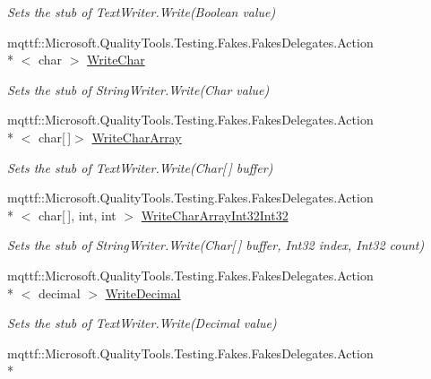 \begin{DoxyCompactItemize}
\begin{DoxyCompactList}\small\item\em Sets the stub of Text\-Writer.\-Write(\-Boolean value)\end{DoxyCompactList}\item 
mqttf\-::\-Microsoft.\-Quality\-Tools.\-Testing.\-Fakes.\-Fakes\-Delegates.\-Action\\*
$<$ char $>$ \hyperlink{class_system_1_1_i_o_1_1_fakes_1_1_stub_string_writer_a9c82eb35f37789f914836de0ba08ab08}{Write\-Char}
\begin{DoxyCompactList}\small\item\em Sets the stub of String\-Writer.\-Write(\-Char value)\end{DoxyCompactList}\item 
mqttf\-::\-Microsoft.\-Quality\-Tools.\-Testing.\-Fakes.\-Fakes\-Delegates.\-Action\\*
$<$ char\mbox{[}$\,$\mbox{]}$>$ \hyperlink{class_system_1_1_i_o_1_1_fakes_1_1_stub_string_writer_abdcafadde4a145373695a8e22b3c313a}{Write\-Char\-Array}
\begin{DoxyCompactList}\small\item\em Sets the stub of Text\-Writer.\-Write(\-Char\mbox{[}$\,$\mbox{]} buffer)\end{DoxyCompactList}\item 
mqttf\-::\-Microsoft.\-Quality\-Tools.\-Testing.\-Fakes.\-Fakes\-Delegates.\-Action\\*
$<$ char\mbox{[}$\,$\mbox{]}, int, int $>$ \hyperlink{class_system_1_1_i_o_1_1_fakes_1_1_stub_string_writer_a859baea6334c4b7eb0cb2041af7749e7}{Write\-Char\-Array\-Int32\-Int32}
\begin{DoxyCompactList}\small\item\em Sets the stub of String\-Writer.\-Write(\-Char\mbox{[}$\,$\mbox{]} buffer, Int32 index, Int32 count)\end{DoxyCompactList}\item 
mqttf\-::\-Microsoft.\-Quality\-Tools.\-Testing.\-Fakes.\-Fakes\-Delegates.\-Action\\*
$<$ decimal $>$ \hyperlink{class_system_1_1_i_o_1_1_fakes_1_1_stub_string_writer_a9d3cf0b980bcfd8f2923f59527c0ce15}{Write\-Decimal}
\begin{DoxyCompactList}\small\item\em Sets the stub of Text\-Writer.\-Write(\-Decimal value)\end{DoxyCompactList}\item 
mqttf\-::\-Microsoft.\-Quality\-Tools.\-Testing.\-Fakes.\-Fakes\-Delegates.\-Action\\*

\end{DoxyCompactItemize}
